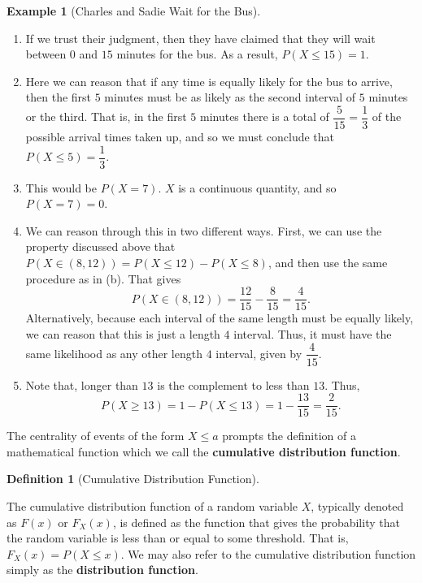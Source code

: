 \documentclass[
  letterpaper,
  DIV=11,
  numbers=noendperiod]{scrreprt}
\providecommand{\tightlist}{%
  \setlength{\itemsep}{0pt}\setlength{\parskip}{0pt}}\usepackage{longtable,booktabs,array}
\theoremstyle{definition}
\theoremstyle{definition}
\newtheorem{example}{Example}[chapter]
\theoremstyle{definition}
\newtheorem{definition}{Definition}[chapter]
\theoremstyle{remark}
\begin{document}
\begin{example}[Charles and Sadie Wait for the
Bus]
\begin{tcolorbox}[enhanced jigsaw, colback=white, colframe=quarto-callout-color-frame, arc=.35mm, leftrule=.75mm, rightrule=.15mm, opacityback=0, breakable, bottomrule=.15mm, left=2mm, toprule=.15mm]
\begin{enumerate}
\def\labelenumi{\alph{enumi}.}
\tightlist
\item
  If we trust their judgment, then they have claimed that they will wait
  between \(0\) and \(15\) minutes for the bus. As a result,
  \(P(X \leq 15) = 1\).
\item
  Here we can reason that if any time is equally likely for the bus to
  arrive, then the first \(5\) minutes must be as likely as the second
  interval of \(5\) minutes or the third. That is, in the first \(5\)
  minutes there is a total of \(\dfrac{5}{15} = \dfrac{1}{3}\) of the
  possible arrival times taken up, and so we must conclude that
  \(P(X \leq 5) = \dfrac{1}{3}\).
\item
  This would be \(P(X = 7)\). \(X\) is a continuous quantity, and so
  \(P(X = 7) = 0\).
\item
  We can reason through this in two different ways. First, we can use
  the property discussed above that
  \(P(X \in (8, 12)) = P(X \leq 12) - P(X\leq 8)\), and then use the
  same procedure as in (b). That gives
  \[P(X \in (8, 12)) = \dfrac{12}{15} - \dfrac{8}{15} = \dfrac{4}{15}.\]
  Alternatively, because each interval of the same length must be
  equally likely, we can reason that this is just a length \(4\)
  interval. Thus, it must have the same likelihood as any other length
  \(4\) interval, given by \(\dfrac{4}{15}\).
\item
  Note that, longer than \(13\) is the complement to less than \(13\).
  Thus,
  \[P(X \geq 13) = 1 - P(X \leq 13) = 1 - \dfrac{13}{15} = \dfrac{2}{15}.\]
\end{enumerate}

\end{tcolorbox}

\end{example}

The centrality of events of the form \(X \leq a\) prompts the definition
of a mathematical function which we call the \textbf{cumulative
distribution function}.

\begin{definition}[Cumulative Distribution
Function]\protect\hypertarget{def-cdf}{}\label{def-cdf}

The cumulative distribution function of a random variable \(X\),
typically denoted as \(F(x)\) or \(F_X(x)\), is defined as the function
that gives the probability that the random variable is less than or
equal to some threshold. That is, \(F_X(x) = P(X \leq x)\). We may also
refer to the cumulative distribution function simply as the
\textbf{distribution function}.

\end{definition}
\end{document}
